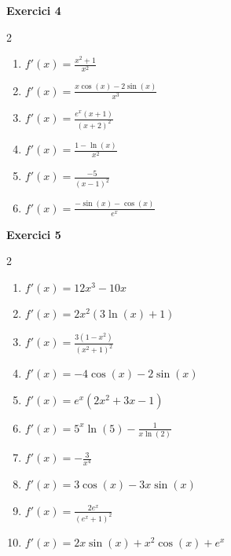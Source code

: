 \documentclass[12pt,a4paper]{article}
\begin{document}
\textbf{Exercici 4}
\begin{multicols}{2}
\begin{enumerate}[label=\alph*)]
    \item $f'(x) = \frac{x^2 + 1}{x^2}$
    \item $f'(x) = \frac{x\cos(x) - 2\sin(x)}{x^3}$
    \item $f'(x) = \frac{e^x(x + 1)}{(x + 2)^2}$
    \item $f'(x) = \frac{1 - \ln(x)}{x^2}$
    \item $f'(x) = \frac{-5}{(x - 1)^2}$
    \item $f'(x) = \frac{-\sin(x) - \cos(x)}{e^x}$
\end{enumerate}
\end{multicols}

\textbf{Exercici 5}
\begin{multicols}{2}
\begin{enumerate}[label=\alph*)]
    \item $f'(x) = 12x^3 - 10x$
    \item $f'(x) = 2x^2(3\ln(x) + 1)$
    \item $f'(x) = \frac{3(1 - x^2)}{(x^2 + 1)^2}$
    \item $f'(x) = -4\cos(x) - 2\sin(x)$
    \item $f'(x) = e^x(2x^2 + 3x - 1)$
    \item $f'(x) = 5^x \ln(5) - \frac{1}{x \ln(2)}$
    \item $f'(x) = -\frac{3}{x^4}$
    \item $f'(x) = 3\cos(x) - 3x\sin(x)$
    \item $f'(x) = \frac{2e^x}{(e^x + 1)^2}$
    \item $f'(x) = 2x\sin(x) + x^2\cos(x) + e^x$
\end{enumerate}
\end{multicols}
\end{document}
